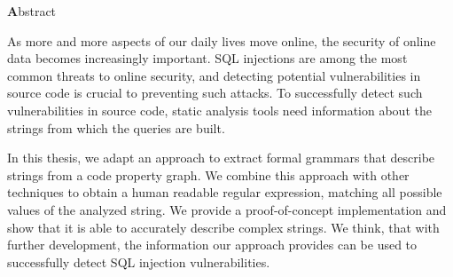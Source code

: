 \vspace*{2cm}

\begin{center}
{ \textbf Abstract}
\end{center}
\noindent


As more and more aspects of our daily lives move online, the security of online data becomes increasingly important. SQL injections are among the most common threats to online security, and detecting potential vulnerabilities in source code is crucial to preventing such attacks. To successfully detect such vulnerabilities in source code, static analysis tools need information about the strings from which the queries are built.

In this thesis, we adapt an approach to extract formal grammars that describe strings from a code property graph. We combine this approach with other techniques to obtain a human readable regular expression, matching all possible values of the analyzed string.
We provide a proof-of-concept implementation and show that it is able to accurately describe complex strings. We think, that with further development, the information our approach provides can be used to successfully detect SQL injection vulnerabilities.